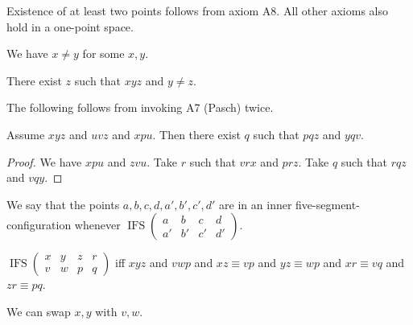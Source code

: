 \documentclass[10pt,a4paper,parskip=half,numbers=endperiod,headings=standardclasses,parskip]{scrartcl}
\newcommand{\Cong}[4]{#1 #2 \equiv #3 #4}
\newcommand{\Betw}[3]{#1 #2 #3}
\newcommand{\IFS}[8]{\operatorname{IFS}
\left(
\begin{smallmatrix}%
#1 & #2 & #3 & #4 \\
#5 & #6 & #7 & #8
\end{smallmatrix}
\right)%
}
\begin{document}
  Existence of at least two points follows from axiom A8.
  All other axioms also hold in a one-point space.

  \begin{forthel}
    \begin{lemma} %
      We have $x \neq y$ for some $x, y$.
    \end{lemma}

    \begin{lemma} %
      There exist $z$ such that $\Betw{x}{y}{z}$ and $y \neq z$.
    \end{lemma}
  \end{forthel}

  The following follows from invoking A7 (Pasch) twice.

  \begin{forthel}
    \begin{lemma} %
      Assume $\Betw{x}{y}{z}$ and $\Betw{u}{v}{z}$ and $\Betw{x}{p}{u}$.
      Then there exist $q$ such that $\Betw{p}{q}{z}$ and $\Betw{y}{q}{v}$.
    \end{lemma}
    \begin{proof}
      We have $\Betw{x}{p}{u}$ and $\Betw{z}{v}{u}$.
    	Take $r$ such that $\Betw{v}{r}{x}$ and $\Betw{p}{r}{z}$. %
    	Take $q$ such that $\Betw{r}{q}{z}$ and $\Betw{v}{q}{y}$. %
    \end{proof}
  \end{forthel}


  We say that the points $a,b,c,d,a',b',c',d'$ are
  in an inner five-segment-configuration
  whenever $\IFS{a}{b}{c}{d}{a'}{b'}{c'}{d'}$.

  \begin{forthel}
    \begin{definition} %
      $\IFS{x}{y}{z}{r}{v}{w}{p}{q}$ iff
      $\Betw{x}{y}{z}$ and $\Betw{v}{w}{p}$
      and $\Cong{x}{z}{v}{p}$ and $\Cong{y}{z}{w}{p}$
      and $\Cong{x}{r}{v}{q}$ and $\Cong{z}{r}{p}{q}$.
    \end{definition}
  \end{forthel}

  We can swap $x, y$ with $v, w$.
\end{document}
